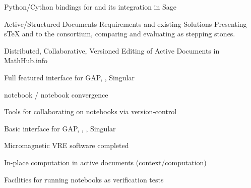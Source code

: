 \begin{workpackage}
\begin{wpdelivs}
  \begin{wpdeliv}[due=6,id=pari-python-lib1,dissem=PU,nature=OTHER,lead=UB]
	  {Python/Cython bindings for \Pari and its integration in Sage}
  \end{wpdeliv}
  \begin{wpdeliv}[id=adstex,due=6,miles=startup,nature=R,dissem=PU,lead=JU]
    {Active/Structured Documents Requirements and existing Solutions} Presenting sTeX and
    \Jupyter to the consortium, comparing and evaluating as stepping stones.
  \end{wpdeliv}
    \begin{wpdeliv}[id=mathhub-editing,due=12,miles=startup,nature=DEM,dissem=PU,lead=JU]
      {Distributed, Collaborative, Versioned Editing of Active Documents in MathHub.info}
    \end{wpdeliv}
  \begin{wpdeliv}[due=12,id=ipython-kernels,miles=startup,dissem=PU,nature=OTHER,lead=PS]
      {Full featured \Jupyter interface for GAP, \PariGP, Singular}
  \end{wpdeliv}
  \begin{wpdeliv}[due=12,id=ipython-kernel-sage,miles=startup,dissem=PU,nature=DEM,lead=PS]
      {\Sage notebook / \Jupyter notebook convergence}
  \end{wpdeliv}
  \begin{wpdeliv}[due=12,id=jupyter-collab,miles=startup,dissem=PU,nature=OTHER,lead=SR]
      {Tools for collaborating on notebooks via version-control}
  \end{wpdeliv}
  \begin{wpdeliv}[due=14,miles=proto1,id=ipython-kernels-basic,dissem=PU,nature=OTHER,lead=PS]
      {Basic \Jupyter interface for GAP, \PariGP, \Sage, Singular}
  \end{wpdeliv}
    \begin{wpdeliv}[due=15,miles=proto1,id=oommf-nb,dissem=PU,nature=OTHER,lead=USO]
      {Micromagnetic VRE software completed}
    \end{wpdeliv}

    \begin{wpdeliv}[id=adcomp,due=18,miles=proto1,nature=DEM,dissem=PU,lead=JU]
      {In-place computation in active documents (context/computation)}
    \end{wpdeliv}

  \begin{wpdeliv}[due=18,miles=proto1,id=jupyter-test,dissem=PU,nature=OTHER,lead=SR]
      {Facilities for running notebooks as verification tests}
  \end{wpdeliv}


\end{wpdelivs}
\end{workpackage}
